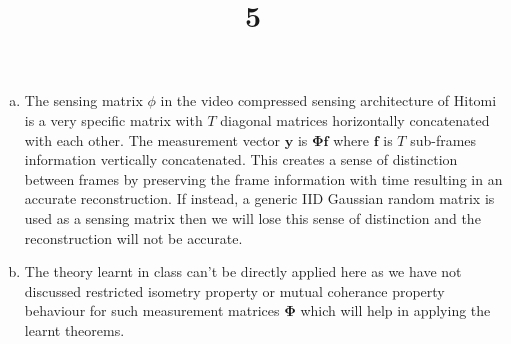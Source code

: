 \documentclass[a4paper]{article}
\title{5}
\date{}
\begin{document}
\maketitle
\begin{enumerate}[(a)]
\item The sensing matrix $\phi$ in the video compressed sensing architecture of Hitomi is a very specific matrix with $T$ diagonal matrices horizontally concatenated with each other. The measurement vector $\bm{y}$ is $\bm{\Phi f}$ where $\bm{f}$ is $T$ sub-frames information vertically concatenated. This creates a sense of distinction between frames by preserving the frame information with time resulting in an accurate reconstruction. If instead, a generic IID Gaussian random matrix is used as a sensing matrix then we will lose this sense of distinction and the reconstruction will not be accurate.
\item The theory learnt in class can't be directly applied here as we have not discussed restricted isometry property or mutual coherance property behaviour for such measurement matrices $\bm{\Phi}$ which will help in applying the learnt theorems.
\end{enumerate}
\end{document}
